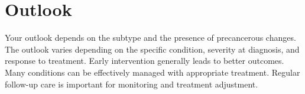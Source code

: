 \section{Outlook}
Your outlook depends on the subtype and the presence of precancerous changes. The outlook varies depending on the specific condition, severity at diagnosis, and response to treatment. Early intervention generally leads to better outcomes. Many conditions can be effectively managed with appropriate treatment. Regular follow-up care is important for monitoring and treatment adjustment.

